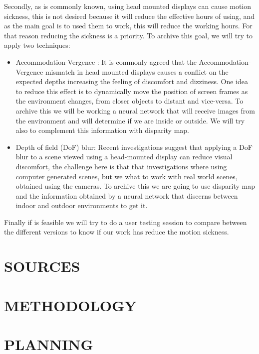 \documentclass[10pt,a4paper,twocolumn,twoside]{article}
\begin{document}
Secondly, as is commonly known, using head mounted displays can cause motion sickness, this is not desired because it will reduce the effective hours of using, and as the main goal is to used them to work, this will reduce the working hours. For that reason reducing the sickness is a priority. To archive this goal, we will try to apply two techniques:
\begin{itemize}
	\item Accommodation-Vergence : It is commonly agreed that the Accommodation-Vergence  mismatch in head mounted displays causes a conflict on the expected depths increasing the feeling of discomfort and dizziness. One idea to reduce this effect is to dynamically move the position of screen frames as the environment changes, from closer objects to distant and vice-versa. To archive this we will be working a neural network that will receive images from the environment and will determine if we are inside or outside. We will try also to complement this information with disparity map.
	
	\item Depth of field (DoF) blur: Recent investigations suggest that applying a DoF blur to a scene viewed using a head-mounted display can reduce visual discomfort, the challenge here is that that investigations where using computer generated scenes, but we what to work with real world scenes, obtained using the cameras.
	To archive this we are going to use disparity map and the information obtained by a neural network that discerns between indoor and outdoor environments to get it.  
\end{itemize} 

Finally if is feasible we will try to do a user testing session to compare between the different versions to know if our work has reduce the motion sickness.


\section{SOURCES}

\section{METHODOLOGY}

\section{PLANNING}
\end{document}
